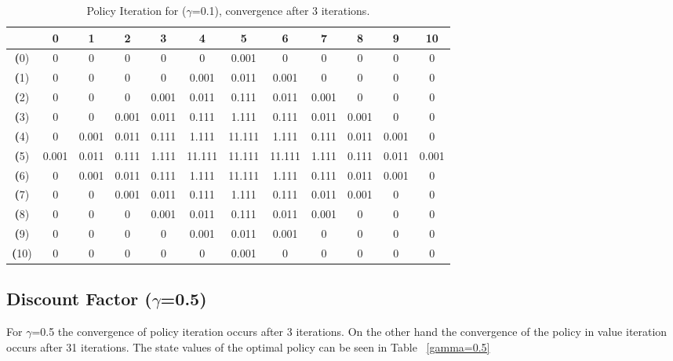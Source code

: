 \documentclass[11pt]{article}
\begin{document}
\begin{center}
\begin{table}[ht]
{\small
\hfill{}
\begin{tabular}{c|c|c|c|c|c|c|c|c|c|c|c}
\textbf{} & \textbf{0} & \textbf{1} & \textbf{2} & \textbf{3} & \textbf{4} & \textbf{5} & \textbf{6} & \textbf{7} & \textbf{8} & \textbf{9} & \textbf{10}\\
	\hline

\textbf(0)& 0	& 0	& 0	& 0	& 0	& 0.001	& 0	& 0	& 0	& 0	& 0	\\
\textbf(1)& 0	& 0	& 0	& 0	& 0.001	& 0.011	& 0.001	& 0	& 0	& 0	& 0	\\
\textbf(2)& 0	& 0	& 0	& 0.001	& 0.011	& 0.111	& 0.011	& 0.001	& 0	& 0	& 0	\\
\textbf(3)& 0	& 0	& 0.001	& 0.011	& 0.111	& 1.111	& 0.111	& 0.011	& 0.001	& 0	& 0	\\
\textbf(4)& 0	& 0.001	& 0.011	& 0.111	& 1.111	& 11.111	& 1.111	& 0.111	& 0.011	& 0.001	& 0	\\
\textbf(5)& 0.001	& 0.011	& 0.111	& 1.111	& 11.111	& 11.111	& 11.111	& 1.111	& 0.111	& 0.011	& 0.001	\\
\textbf(6)& 0	& 0.001	& 0.011	& 0.111	& 1.111	& 11.111	& 1.111	& 0.111	& 0.011	& 0.001	& 0	\\
\textbf(7)& 0	& 0	& 0.001	& 0.011	& 0.111	& 1.111	& 0.111	& 0.011	& 0.001	& 0	& 0	\\
\textbf(8)& 0	& 0	& 0	& 0.001	& 0.011	& 0.111	& 0.011	& 0.001	& 0	& 0	& 0	\\
\textbf(9)& 0	& 0	& 0	& 0	& 0.001	& 0.011	& 0.001	& 0	& 0	& 0	& 0	\\
\textbf(10)& 0	& 0	& 0	& 0	& 0	& 0.001	& 0	& 0	& 0	& 0	& 0	\\

\end{tabular}}
\hfill{}
\caption{Policy Iteration for ($\gamma$=0.1), convergence after 3 iterations.}
\label{table:gamma=0.1}
\end{table}
\end{center}	

\subsection{Discount Factor ($\gamma$=0.5)}

For $\gamma$=0.5 the convergence of policy iteration occurs after 3 iterations. On the other hand the convergence of the policy in value iteration occurs after 31 iterations. The state values of the optimal policy can be seen in Table ~\ref{gamma=0.5}
\end{document}
